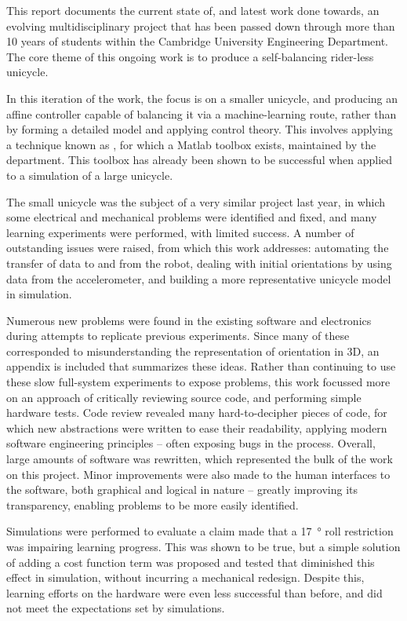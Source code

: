 \documentclass[main.tex]{subfiles}
\begin{document}
This report documents the current state of, and latest work done towards, an evolving multidisciplinary project that has been passed down through more than 10 years of students within the Cambridge University Engineering Department. The core theme of this ongoing work is to produce a self-balancing rider-less unicycle.

In this iteration of the work, the focus is on a smaller unicycle, and producing an affine controller capable of balancing it via a machine-learning route, rather than by forming a detailed model and applying control theory. This involves applying a technique known as {\Pilco}, for which a Matlab toolbox exists, maintained by the department. This toolbox has already been shown to be successful when applied to a simulation of a large unicycle.

The small unicycle was the subject of a very similar project last year, in which some electrical and mechanical problems were identified and fixed, and many learning experiments were performed, with limited success.
A number of outstanding issues were raised, from which this work addresses:
automating the transfer of data to and from the robot,
dealing with initial orientations by using data from the accelerometer,
and building a more representative unicycle model in simulation.

Numerous new problems were found in the existing software and electronics during attempts to replicate previous experiments.
Since many of these corresponded to misunderstanding the representation of orientation in 3D, an appendix is included that summarizes these ideas.
Rather than continuing to use these slow full-system experiments to expose problems, this work focussed more on an approach of critically reviewing source code, and performing simple hardware tests.
Code review revealed many hard-to-decipher pieces of code, for which new abstractions were written to ease their readability, applying modern software engineering principles -- often exposing bugs in the process.
Overall, large amounts of software was rewritten, which represented the bulk of the work on this project.
Minor improvements were also made to the human interfaces to the software, both graphical and logical in nature -- greatly improving its transparency, enabling problems to be more easily identified.

Simulations were performed to evaluate a claim made that a \SI{17}{\degree} roll restriction was impairing learning progress. This was shown to be true, but a simple solution of adding a cost function term was proposed and tested that diminished this effect in simulation, without incurring a mechanical redesign.
Despite this, learning efforts on the hardware were even less successful than before, and did not meet the expectations set by simulations.
\end{document}

